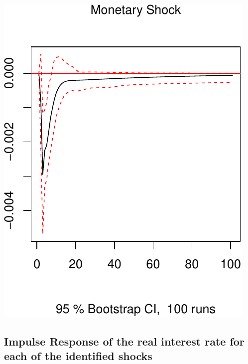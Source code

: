 \documentclass[11pt,preprint, authoryear]{elsarticle}
\numberwithin{equation}{section}
\numberwithin{figure}{section}
\numberwithin{table}{section}
\begin{document}
\includegraphics{TS_proj_files/figure-latex/unnamed-chunk-18-3.pdf}

\hypertarget{impulse-response-of-the-real-interest-rate-for-each-of-the-identified-shocks}{%
\subsection{Impulse Response of the real interest rate for each of the
identified
shocks}\label{impulse-response-of-the-real-interest-rate-for-each-of-the-identified-shocks}}
\end{document}
